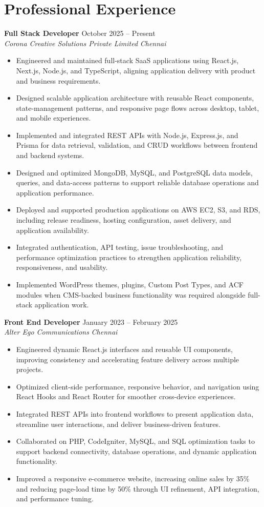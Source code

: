 \documentclass[12pt,a4paper]{article}
\newcommand{\resumeSubheading}[4]{
  \vspace{2pt}
  \textbf{#1} \hfill #2 \\
  \textit{#3} \hfill \textit{#4} \\
}
\begin{document}
\section*{Professional Experience}
\resumeSubheading{Full Stack Developer}{October 2025 -- Present}{Corona Creative Solutions Private Limited}{Chennai}
\begin{itemize}[leftmargin=1.2em,itemsep=4pt,topsep=4pt]
    \item Engineered and maintained full-stack SaaS applications using React.js, Next.js, Node.js, and TypeScript, aligning application delivery with product and business requirements.
    \item Designed scalable application architecture with reusable React components, state-management patterns, and responsive page flows across desktop, tablet, and mobile experiences.
    \item Implemented and integrated REST APIs with Node.js, Express.js, and Prisma for data retrieval, validation, and CRUD workflows between frontend and backend systems.
    \item Designed and optimized MongoDB, MySQL, and PostgreSQL data models, queries, and data-access patterns to support reliable database operations and application performance.
    \item Deployed and supported production applications on AWS EC2, S3, and RDS, including release readiness, hosting configuration, asset delivery, and application availability.
    \item Integrated authentication, API testing, issue troubleshooting, and performance optimization practices to strengthen application reliability, responsiveness, and usability.
    \item Implemented WordPress themes, plugins, Custom Post Types, and ACF modules when CMS-backed business functionality was required alongside full-stack application work.
\end{itemize}

\resumeSubheading{Front End Developer}{January 2023 -- February 2025}{Alter Ego Communications}{Chennai}
\begin{itemize}[leftmargin=1.2em,itemsep=4pt,topsep=4pt]
    \item Engineered dynamic React.js interfaces and reusable UI components, improving consistency and accelerating feature delivery across multiple projects.
    \item Optimized client-side performance, responsive behavior, and navigation using React Hooks and React Router for smoother cross-device experiences.
    \item Integrated REST APIs into frontend workflows to present application data, streamline user interactions, and deliver business-driven features.
    \item Collaborated on PHP, CodeIgniter, MySQL, and SQL optimization tasks to support backend connectivity, database operations, and dynamic application functionality.
    \item Improved a responsive e-commerce website, increasing online sales by 35\% and reducing page-load time by 50\% through UI refinement, API integration, and performance tuning.
\end{itemize}
\end{document}
